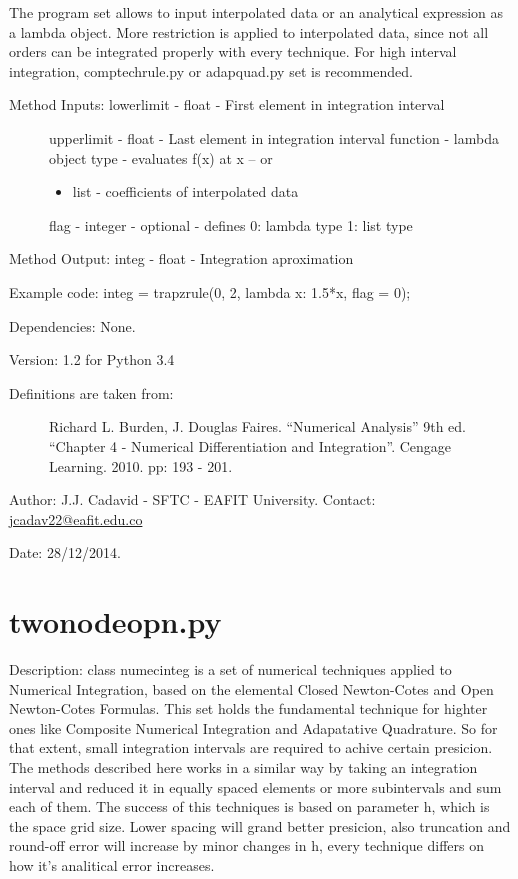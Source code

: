 \documentclass[letterpaper,10pt,oneside]{sphinxmanual}
\theoremstyle{plain}%
\theoremstyle{definition}%
\theoremstyle{remark}%
\begin{document}
The program set allows to input interpolated data or an analytical expression
as a lambda object. More restriction is applied to interpolated data, since
not all orders can be integrated properly with every technique. For high 
interval integration, comptechrule.py or adapquad.py set is recommended.
\begin{description}
\item[{Method Inputs: lowerlimit - float - First element in integration interval}] \leavevmode
upperlimit - float - Last element in integration interval
function - lambda object type - evaluates f(x) at x -- or
\begin{itemize}
\item {} 
list - coefficients of interpolated data

\end{itemize}

flag - integer - optional - defines 0: lambda type 1: list type

\end{description}

Method Output: integ - float - Integration aproximation

Example code: integ = trapzrule(0, 2, lambda x: 1.5*x, flag = 0);

Dependencies: None.

Version: 1.2 for Python 3.4
\begin{description}
\item[{Definitions are taken from:}] \leavevmode
Richard L. Burden, J. Douglas Faires. ``Numerical Analysis'' 9th ed.
``Chapter 4 - Numerical Differentiation and Integration''. 
Cengage Learning. 2010. pp: 193 - 201.

\end{description}

Author: J.J. Cadavid - SFTC - EAFIT University.
Contact: \href{mailto:jcadav22@eafit.edu.co}{jcadav22@eafit.edu.co}

Date: 28/12/2014.


\section{twonodeopn.py}
\label{code:module-twonodeopn}\label{code:twonodeopn-py}
Description: class numecinteg is a set of numerical techniques applied to
Numerical Integration, based on the elemental Closed Newton-Cotes and
Open Newton-Cotes Formulas. This set holds the fundamental technique for
highter ones like Composite Numerical Integration and Adapatative Quadrature.
So for that extent, small integration intervals are required to achive certain
presicion. The methods described here works in a similar way by taking an
integration interval and reduced it in equally spaced elements or more 
subintervals and sum each of them. The success of this techniques is based
on parameter h, which is the space grid size. Lower spacing will grand better
presicion, also truncation and round-off error will increase by minor changes
in h, every technique differs on how it's analitical error increases.
\end{document}
